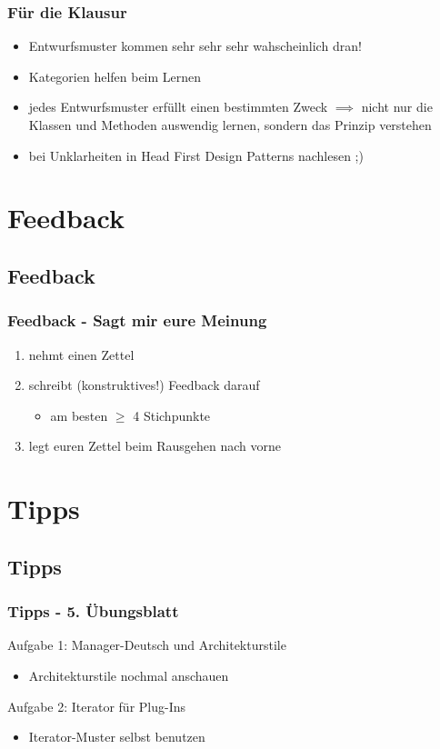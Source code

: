 \documentclass[18pt]{beamer}
\begin{document}
	
	\begin{frame}
		\frametitle{Für die Klausur}
		\begin{itemize}
			\item Entwurfsmuster kommen sehr sehr sehr wahscheinlich dran! \pause 
			\item Kategorien helfen beim Lernen \pause
			\item jedes Entwurfsmuster erfüllt einen bestimmten Zweck 
			\linebreak $\implies$ nicht nur die Klassen und Methoden auswendig lernen, sondern das Prinzip verstehen \pause
			\item bei Unklarheiten in Head First Design Patterns nachlesen ;)
		\end{itemize}
	\end{frame}

\section{Feedback}
	\subsection{Feedback}
	\begin{frame}
		\frametitle{Feedback - Sagt mir eure Meinung}
		\begin{enumerate}
			\item nehmt einen Zettel
			\item schreibt (konstruktives!) Feedback darauf
			\begin{itemize}
				\item am besten $\geq$ 4 Stichpunkte
			\end{itemize}
			\item legt euren Zettel beim Rausgehen nach vorne
		\end{enumerate}
\end{frame}
	
\section{Tipps}
	\subsection{Tipps}
	\begin{frame}
		\frametitle{Tipps - 5. Übungsblatt}
			\begin{exampleblock}{Aufgabe 1: Manager-Deutsch und Architekturstile} 
				\begin{itemize}
					\item Architekturstile nochmal anschauen
				\end{itemize}
			\end{exampleblock}
			\pause
			\begin{exampleblock}{Aufgabe 2: Iterator für Plug-Ins} 
				\begin{itemize}
					\item Iterator-Muster selbst benutzen
				\end{itemize}
			\end{exampleblock}
	\end{frame}
\end{document}
